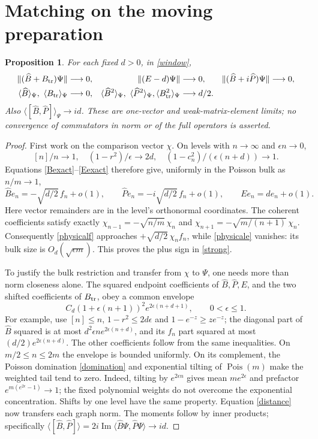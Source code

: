 \documentclass[11pt]{article}
\newtheorem{proposition}{Proposition}
\newcommand{\eps}{\epsilon}
\newcommand{\B}{\widehat B}
\newcommand{\PP}{\widehat P}
\newcommand{\Bt}{B_{\rm tr}}
\newcommand{\Pois}{\operatorname{Pois}}
\begin{document}
\newpage
\section{Matching on the moving preparation}
\begin{proposition}\label{matching}
For each fixed $d>0$, in \eqref{window},
\begin{align}
 \|(\B+\Bt)\Psi\|&\longrightarrow0,&
 \|(E-d)\Psi\|&\longrightarrow0,&
 \|(\B+i\PP)\Psi\|&\longrightarrow0,\label{strong}\\
 \langle\B\rangle_\Psi,\ \langle\Bt\rangle_\Psi&\longrightarrow0,&
 \langle\B^2\rangle_\Psi,\ \langle\PP^2\rangle_\Psi,
 \langle\Bt^2\rangle_\Psi&\longrightarrow d/2.\label{moments}
\end{align}
Also $\langle[\B,\PP]\rangle_\Psi\to id$. These are
one-vector and weak-matrix-element limits; no convergence of
commutators in norm or of the full operators is asserted.
\end{proposition}
\begin{proof}
First work on the comparison vector $\chi$.
On levels with $n\to\infty$ and $\eps n\to0$,
\[
 [n]/n\to1,\quad(1-r^2)/\eps\to2d,\quad
 (1-c_n^2)/(\eps(n+d))\to1.
\]
Equations \eqref{Bexact}--\eqref{Eexact} therefore give,
uniformly in the Poisson bulk as $n/m\to1$,
\[
 \B e_n=-\sqrt{d/2}\,f_n+o(1),\qquad
 \PP e_n=-i\sqrt{d/2}\,f_n+o(1),\qquad E e_n=de_n+o(1).
\]
Here vector remainders are in the level's orthonormal coordinates.
The coherent coefficients satisfy exactly
$\chi_{n-1}=-\sqrt{n/m}\,\chi_n$ and
$\chi_{n+1}=-\sqrt{m/(n+1)}\,\chi_n$.
Consequently \eqref{physicalf} approaches
$+\sqrt{d/2}\,\chi_n f_n$, while \eqref{physicale} vanishes:
its bulk size is $O_d(\sqrt{\eps m})$.
This proves the plus sign in \eqref{strong}.

To justify the bulk restriction and transfer from $\chi$ to
$\Psi$, one needs more than norm closeness alone. The squared
endpoint coefficients of $\B,\PP,E$, and the two shifted
coefficients of $\Bt$, obey a common envelope
\begin{equation}
 C_d(1+\eps(n+1))^2 e^{2\eps(n+d+1)},\qquad0<\eps\le1.\label{envelope}
\end{equation}
For example, use $[n]\le n$, $1-r^2\le2d\eps$ and
$1-e^{-z}\ge ze^{-z}$; the diagonal part of $\B$ squared
is at most $d^2\eps n e^{2\eps(n+d)}$, and its $f_n$
part squared at most $(d/2)e^{2\eps(n+d)}$.
The other coefficients follow from the same inequalities.
On $m/2\le n\le2m$ the envelope is bounded uniformly.
On its complement, the Poisson domination \eqref{domination}
and exponential tilting of $\Pois(m)$ make the weighted tail
tend to zero. Indeed, tilting by $e^{2\eps n}$ gives mean
$me^{2\eps}$ and prefactor $e^{m(e^{2\eps}-1)}\to1$;
the fixed polynomial weights do not overcome the exponential
concentration. Shifts by one level have the same property.
Equation \eqref{distance} now transfers each graph norm.
The moments follow by inner products; specifically
$\langle[\B,\PP]\rangle=2i\operatorname{Im}
\langle\B\Psi,\PP\Psi\rangle\to id$.
\end{proof}
\end{document}
